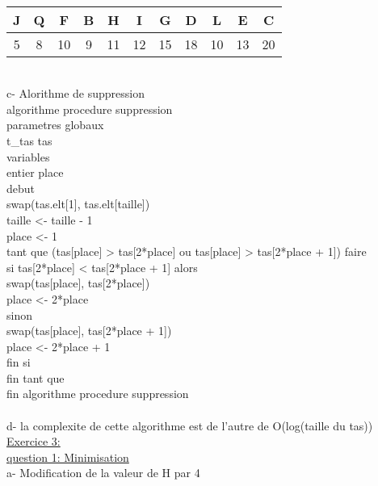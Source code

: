 \documentclass [11pt]{report}
\begin{document}
\vspace{2mm}\\
\begin{tabular}{|c|c|c|c|c|c|c|c|c|c|c|}
\hline J & Q & F  & B & H  & I  & G  &  D & L  & E  & C \\ 
\hline 5 & 8 & 10 & 9 & 11 & 12 & 15 & 18 & 10 & 13 & 20 \\ 
\hline 
\end{tabular} \\
 c- Alorithme de suppression \\
algorithme procedure suppression\\
\indent parametres globaux \\
\indent \indent t\_tas tas\\
\indent variables\\
\indent \indent entier place\\
debut \\
\indent swap(tas.elt[1], tas.elt[taille])\\
\indent taille <- taille - 1\\
\indent place <- 1\\
\indent tant que (tas[place] > tas[2*place] ou tas[place] > tas[2*place + 1]) faire \\
\indent \indent si tas[2*place] < tas[2*place + 1] alors\\
\indent \indent \indent	swap(tas[place], tas[2*place])\\
\indent \indent \indent	place <- 2*place\\
\indent \indent	sinon\\
\indent \indent \indent	swap(tas[place], tas[2*place + 1])\\
\indent \indent \indent	place <- 2*place + 1\\
\indent \indent	fin si\\
\indent fin tant que\\
fin algorithme procedure suppression\\
\vspace{5mm}\\
 d- la complexite de cette algorithme est de l'autre de O(log(taille du tas))
 \vspace{10mm}\\
 \underline{{\huge Exercice 3:}}\\
\underline{question 1: Minimisation}\\
\indent a- Modification de la valeur de H par 4\\
\\
\end{document}

